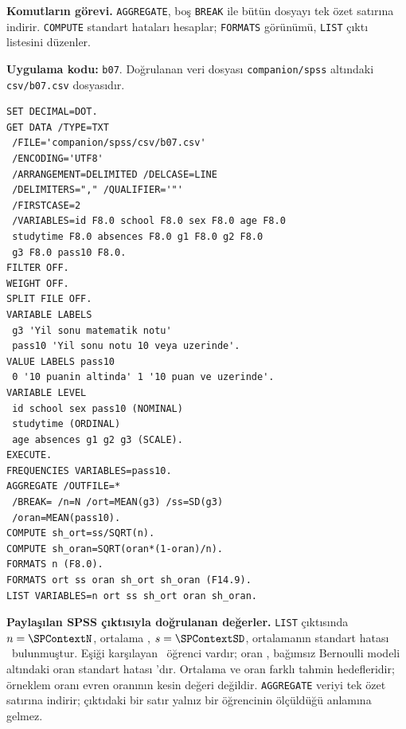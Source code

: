 {\raggedright
\noindent\textbf{Komutların görevi.} \texttt{AGGREGATE}, boş \texttt{BREAK} ile bütün dosyayı tek özet satırına indirir. \texttt{COMPUTE} standart hataları hesaplar; \texttt{FORMATS} görünümü, \texttt{LIST} çıktı listesini düzenler.\par}

\textbf{Uygulama kodu:} \texttt{b07}. Doğrulanan veri dosyası
\texttt{companion/spss} altındaki \texttt{csv/b07.csv} dosyasıdır.

\begin{lstlisting}[style=prismSPSS]
SET DECIMAL=DOT.
GET DATA /TYPE=TXT
 /FILE='companion/spss/csv/b07.csv'
 /ENCODING='UTF8'
 /ARRANGEMENT=DELIMITED /DELCASE=LINE
 /DELIMITERS="," /QUALIFIER='"'
 /FIRSTCASE=2
 /VARIABLES=id F8.0 school F8.0 sex F8.0 age F8.0
 studytime F8.0 absences F8.0 g1 F8.0 g2 F8.0
 g3 F8.0 pass10 F8.0.
FILTER OFF.
WEIGHT OFF.
SPLIT FILE OFF.
VARIABLE LABELS
 g3 'Yil sonu matematik notu'
 pass10 'Yil sonu notu 10 veya uzerinde'.
VALUE LABELS pass10
 0 '10 puanin altinda' 1 '10 puan ve uzerinde'.
VARIABLE LEVEL
 id school sex pass10 (NOMINAL)
 studytime (ORDINAL)
 age absences g1 g2 g3 (SCALE).
EXECUTE.
FREQUENCIES VARIABLES=pass10.
AGGREGATE /OUTFILE=*
 /BREAK= /n=N /ort=MEAN(g3) /ss=SD(g3)
 /oran=MEAN(pass10).
COMPUTE sh_ort=ss/SQRT(n).
COMPUTE sh_oran=SQRT(oran*(1-oran)/n).
FORMATS n (F8.0).
FORMATS ort ss oran sh_ort sh_oran (F14.9).
LIST VARIABLES=n ort ss sh_ort oran sh_oran.
\end{lstlisting}

\begin{outputguidebox}
\textbf{Paylaşılan SPSS çıktısıyla doğrulanan değerler.}
\texttt{LIST} çıktısında $n=\SPContextN$, ortalama \SPContextMean,
$s=\SPContextSD$, ortalamanın standart hatası \SPContextSE\ bulunmuştur.
Eşiği karşılayan \SPContextPass\ öğrenci vardır; oran \SPContextPHat,
bağımsız Bernoulli modeli altındaki oran standart hatası \SPContextPSE'dır.
Ortalama ve oran farklı tahmin hedefleridir; örneklem oranı evren oranının
kesin değeri değildir. \texttt{AGGREGATE} veriyi tek özet satırına indirir;
çıktıdaki bir satır yalnız bir öğrencinin ölçüldüğü anlamına gelmez.
\end{outputguidebox}


